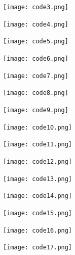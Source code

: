 \documentclass[a4paper,11pt]{article}
\begin{document}
\begin{appendices}
\begin{figure}[H]
    \centering
    \texttt{[image: code3.png]}
\end{figure}

\begin{figure}[H]
    \centering
    \texttt{[image: code4.png]}
\end{figure}

\begin{figure}[H]
    \centering
    \texttt{[image: code5.png]}
\end{figure}

\begin{figure}[H]
    \centering
    \texttt{[image: code6.png]}
\end{figure}

\begin{figure}[H]
    \centering
    \texttt{[image: code7.png]}
\end{figure}

\begin{figure}[H]
    \centering
    \texttt{[image: code8.png]}
\end{figure}

\begin{figure}[H]
    \centering
    \texttt{[image: code9.png]}
\end{figure}

\begin{figure}[H]
    \centering
    \texttt{[image: code10.png]}
\end{figure}

\begin{figure}[H]
    \centering
    \texttt{[image: code11.png]}
\end{figure}

\begin{figure}[H]
    \centering
    \texttt{[image: code12.png]}
\end{figure}

\begin{figure}[H]
    \centering
    \texttt{[image: code13.png]}
\end{figure}

\begin{figure}[H]
    \centering
    \texttt{[image: code14.png]}
\end{figure}

\begin{figure}[H]
    \centering
    \texttt{[image: code15.png]}
\end{figure}

\begin{figure}[H]
    \centering
    \texttt{[image: code16.png]}
\end{figure}

\begin{figure}[H]
    \centering
    \texttt{[image: code17.png]}
\end{figure}
\end{appendices}

\usepackage[final]{pdfpages}

\end{document}
